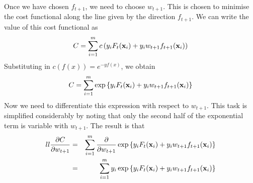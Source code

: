 Once we have chosen $f_{t+1}$, we need to choose $w_{t+1}$.  This is
chosen to minimise the cost functional along the line given by the
direction $f_{t+1}$.  We can write the value of this cost functional
as
%
\begin{equation}
C = \sum_{i=1}^{m} c \left( y_i F_t(\mathbf{x}_i) + y_i w_{t+1}
f_{t+1}(\mathbf{x}_i) \right)
\end{equation}
Substituting in $c(f(x)) = e^{-yf(x)}$, we obtain
%
\begin{equation}
C = \sum_{i=1}^{m} \exp \left\{ y_i F_t(\mathbf{x}_i) + y_i w_{t+1}
f_{t+1}(\mathbf{x}_i) \right\}
\end{equation}
%
Now we need to differentiate this expression with respect to
$w_{t+1}$.   This task is simplified considerably by noting that only
the second half of the exponential term is variable with $w_{t+1}$.
The result is that
%
\begin{eqnarray}{ll}
\frac{\partial C}{\partial w_{t+1}} &
= & \sum_{i=1}^{m} \frac{\partial}{\partial w_{t+1}}
\exp \left\{ y_i F_t(\mathbf{x}_i) + y_i w_{t+1}
f_{t+1}(\mathbf{x}_i) \right\} \nonumber \\
& = & \sum_{i=1}^{m} y_i \exp \left\{ y_i F_t(\mathbf{x}_i) + y_i w_{t+1}
f_{t+1}(\mathbf{x}_i) \right\} 
\end{eqnarray}




